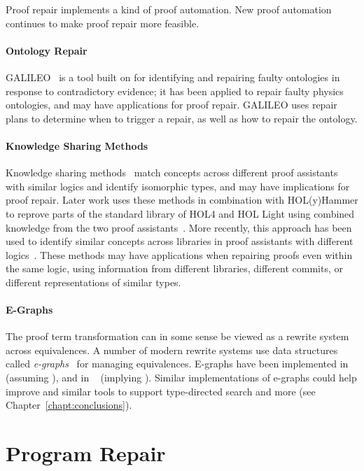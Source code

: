 Proof repair implements a kind of proof automation.
New proof automation continues to make proof repair more feasible.

\paragraph{Ontology Repair}
GALILEO~\cite{chan2011galileo} is a tool built on  for identifying and repairing faulty ontologies in response to contradictory
evidence; it has been applied to repair faulty physics ontologies, and may have applications for proof repair.
GALILEO uses repair plans to determine when to trigger a repair, as well as how to repair the ontology.

\paragraph{Knowledge Sharing Methods}
Knowledge sharing methods~\cite{gauthier2014} match concepts across
different proof assistants with similar logics and identify isomorphic types,
and may have implications for proof repair.
Later work uses these methods in combination with HOL(y)Hammer to
reprove parts of the standard library of HOL4 and HOL Light using combined knowledge 
from the two proof assistants~\cite{Gauthier2015}. 
More recently, this approach has been used to identify similar concepts
across libraries in proof assistants with different logics~\cite{gauthier2017}.
These methods may have applications
when repairing proofs even within the same logic, using information from different 
libraries, different commits, or different representations of similar types.

\paragraph{E-Graphs} %
The \toolnamec proof term transformation can in some sense be viewed as a rewrite system across equivalences.
A number of modern rewrite systems use data structures called \textit{e-graphs}~\cite{egraph1} for managing equivalences.
E-graphs have been implemented in ~\cite{selsam:lean} (assuming ),
and in ~\cite{egraph6} (implying ).
Similar implementations of e-graphs could help improve \toolnamec and similar tools to support
type-directed search and more (see Chapter~\ref{chapt:conclusions}).

\section{Program Repair}
\label{sec:repair}

